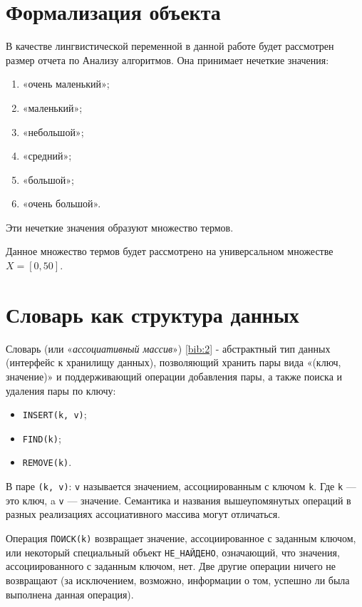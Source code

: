 	\section{Формализация объекта}
	\par В качестве лингвистической переменной в данной работе будет рассмотрен размер отчета по Анализу алгоритмов. Она принимает нечеткие значения:
	\begin{enumerate}
		\item «очень маленький»;
		\item «маленький»;
		\item «небольшой»;
		\item «средний»;
		\item «большой»;
		\item «очень большой».
	\end{enumerate}
	\par Эти нечеткие значения образуют множество термов.
	\par Данное множество термов будет рассмотрено на универсальном множестве \begin{math} X = [0,50]\end{math}.
	\section{Словарь как структура данных}

Словарь (или «\textit{ассоциативный массив}») \ref{bib:2} - абстрактный тип данных (интерфейс к хранилищу данных), позволяющий хранить пары вида «(ключ, значение)» и поддерживающий операции добавления пары, а также поиска и удаления пары по ключу:
\begin{itemize}
	\item \texttt{INSERT(k, v)};
	\item \texttt{FIND(k)};
	\item \texttt{REMOVE(k)}.
\end{itemize}

В паре \texttt{(k, v)}: \texttt{v} называется значением, ассоциированным с ключом \texttt{k}. Где \texttt{k} — это ключ, a \texttt{v} — значение. Семантика и названия вышеупомянутых операций в разных реализациях ассоциативного массива могут отличаться.

Операция \texttt{ПОИСК(k)} возвращает значение, ассоциированное с заданным ключом, или некоторый специальный объект \texttt{НЕ\_НАЙДЕНО}, означающий, что значения, ассоциированного с заданным ключом, нет. Две другие операции ничего не возвращают (за исключением, возможно, информации о том, успешно ли была выполнена данная операция).

